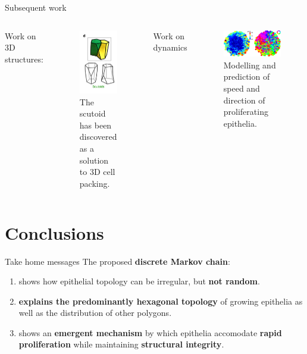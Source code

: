 \documentclass[aspectratio=169, 10pt]{beamer}
\begin{document}
\begin{frame}[fragile]{Subsequent work}
  \begin{columns}[T,onlytextwidth]
    Work on 3D structures:
    \begin{figure}
      \centering
      \includegraphics[width=.3\textwidth]{figures/scutoids.png}
      \caption{The scutoid has been discovered as a solution to 3D cell packing.\cite{gomez2018scutoids}}
    \end{figure}
    Work on dynamics
    \begin{figure}
      \centering
      \includegraphics[width=\textwidth]{figures/Cell_Dynamics.jpg}
      \caption{Modelling and prediction of speed and direction of proliferating epithelia. \cite{aland2015mechanistic}}
      \label{}
    \end{figure}
  \end{columns}
\end{frame}

\section{Conclusions}

\begin{frame}[fragile]{Take home messages} 
  The proposed \textbf{discrete Markov chain}:
  \begin{enumerate}
    \item shows how epithelial topology can be irregular, but \textbf{not random}.
    \item \textbf{explains the predominantly hexagonal topology} of growing epithelia as well as the distribution of other polygons.
    \item shows an \textbf{emergent mechanism} by which epithelia accomodate \textbf{rapid proliferation} while maintaining \textbf{structural integrity}.
  \end{enumerate}
\end{frame}
\end{document}
